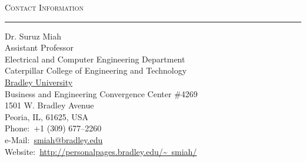 \documentclass[12pt]{article}
\def\dept{Electrical and Computer Engineering Department}
\def\college{Caterpillar College of Engineering and Technology}
\def\uName{Bradley University}
\newcommand{\midskip}[0]{\vspace{3mm}}
\begin{document}
\begin{center}
\vspace*{1.0cm}
\begin{flushleft}
{\color{BrickRed}
{\Large \textsc{Contact Information}}\\
\vskip10pt
\hrule height 1pt
\midskip
}
\vskip10pt
Dr. Suruz Miah\\
Assistant Professor\\
\dept\\
\college\\
\href{http://www.bradley.edu/}{\uName}\\
\vskip10pt
Business and Engineering Convergence Center \#4269 \\
1501 W. Bradley Avenue\\
Peoria, IL, 61625, USA\\
\vskip10pt
Phone:~+1 (309) 677--2260\\
e-Mail:~\href{mailto:smiah@bradley.edu}{smiah@bradley.edu}\\
Website:~\href{http://personalpages.bradley.edu/~smiah/}{http://personalpages.bradley.edu/\~~smiah/}
\vskip15pt
\end{flushleft}

\end{center}
\thispagestyle{empty}
\newpage

%
\pagestyle{fancy}

 \renewcommand{\contentsname}{Table of Contents}
 \tableofcontents 
 \listoffigures
 
\newpage





\end{document}
